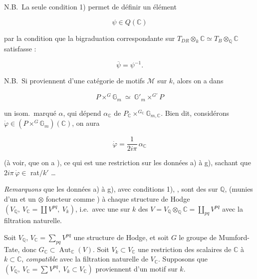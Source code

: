 \documentclass[11pt,a4paper]{article}
\begin{document}
N.B.\ La seule condition 1) permet de définir un élément

\[ \psi \in Q(\mathbb{C}) \]

par la condition que la bigraduation correspondante sur
$T_{DR} \otimes_{k} \mathbb{C} \simeq T_{B} \otimes_{\mathbb{Q}} \mathbb{C}$
satisfasse :

\[ \overline{\psi} = \psi^{-1} . \]

N.B.\ Si  proviennent d'une catégorie de motifs $\mathcal{M}$ sur
$k$, alors on a \ill{} dans

\[ P \times^{G} \mathbb{G}_{m} \ \simeq\ \mathbb{G}'_{m} \times^{G'} P \]

un isom.\ marqué $\alpha$, qui dépend \ill{} $\alpha_{\mathbb{C}}$ de
$P_{\mathbb{C}} \times^{G_{\mathbb{C}}} \mathbb{G}_{m,\mathbb{C}}$. Bien dit,
considérons $\dot{\varphi} \in (P \times^{G} \mathbb{G}_{m})(\mathbb{C})$, on
aura

\[ \dot{\varphi} = \frac{1}{2 i \pi}\, \alpha_{\mathbb{C}} \]

(à voir, que on a \ill{}), ce qui est une restriction 
sur les données a) à g), sachant que $2 i \pi\, \dot{\varphi} \in$ \ill{}
rat$/k'$ \ldots

\emph{Remarquons} que les données a) à g), avec conditions 1),
, sont \struck{\ill{}} des
 sur $\mathbb{Q}$, (munies d'un \ill{} et un
$\otimes$ foncteur  comme \ill{}) à chaque \ill{} structure de
Hodge $(V_{\mathbb{Q}},\ V_{\mathbb{C}} = \coprod V^{pq},\ V_{k})$, i.e.\ avec
une   sur $k$ des \ill{}
$V = V_{\mathbb{Q}} \otimes_{\mathbb{Q}} \mathbb{C} = \coprod_{pq} V^{pq}$ avec
 la filtration naturelle.


\struck{\ill{}}


Soit $V_{\mathbb{Q}}$, $V_{\mathbb{C}} = \sum_{pq} V^{pq}$ une structure de
Hodge, et soit $G$ le groupe de Mumford-Tate, donc
$G_{\mathbb{C}} \subset \operatorname{Aut}_{\mathbb{C}}(V)$. Soit
$V_{k} \subset V_{\mathbb{C}}$ une restriction des scalaires de $\mathbb{C}$ à
$k \subset \mathbb{C}$, \struck{\ill{}} \emph{compatible} avec la filtration
naturelle de $V_{\mathbb{C}}$. Supposons que
$(V_{\mathbb{Q}},\ V_{\mathbb{C}} = \sum V^{pq},\ V_{k} \subset V_{\mathbb{C}})$
proviennent d'un motif sur $k$. \struck{\ill{}}
\end{document}
